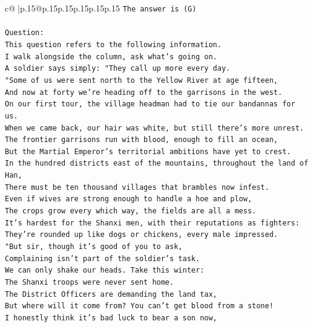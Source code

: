 \documentclass{article}
\begin{document}
{\begin{supertabular}{c@{$\;$}|p{.15\linewidth}@{}p{.15\linewidth}p{.15\linewidth}p{.15\linewidth}p{.15\linewidth}p{.15\linewidth}}
{{{\texttt{The answer is (G)} \\
\\ 
\texttt{Question:} \\
\texttt{This question refers to the following information.} \\
\texttt{I walk alongside the column, ask what's going on.} \\
\texttt{A soldier says simply: "They call up more every day.} \\
\texttt{"Some of us were sent north to the Yellow River at age fifteen,} \\
\texttt{And now at forty we're heading off to the garrisons in the west.} \\
\texttt{On our first tour, the village headman had to tie our bandannas for us.} \\
\texttt{When we came back, our hair was white, but still there's more unrest.} \\
\texttt{The frontier garrisons run with blood, enough to fill an ocean,} \\
\texttt{But the Martial Emperor's territorial ambitions have yet to crest.} \\
\texttt{In the hundred districts east of the mountains, throughout the land of Han,} \\
\texttt{There must be ten thousand villages that brambles now infest.} \\
\texttt{Even if wives are strong enough to handle a hoe and plow,} \\
\texttt{The crops grow every which way, the fields are all a mess.} \\
\texttt{It's hardest for the Shanxi men, with their reputations as fighters:} \\
\texttt{They're rounded up like dogs or chickens, every male impressed.} \\
\texttt{"But sir, though it's good of you to ask,} \\
\texttt{Complaining isn't part of the soldier's task.} \\
\texttt{We can only shake our heads. Take this winter:} \\
\texttt{The Shanxi troops were never sent home.} \\
\texttt{The District Officers are demanding the land tax,} \\
\texttt{But where will it come from? You can't get blood from a stone!} \\
\texttt{I honestly think it's bad luck to bear a son now,} \\
}}}
\end{supertabular}}
\end{document}
